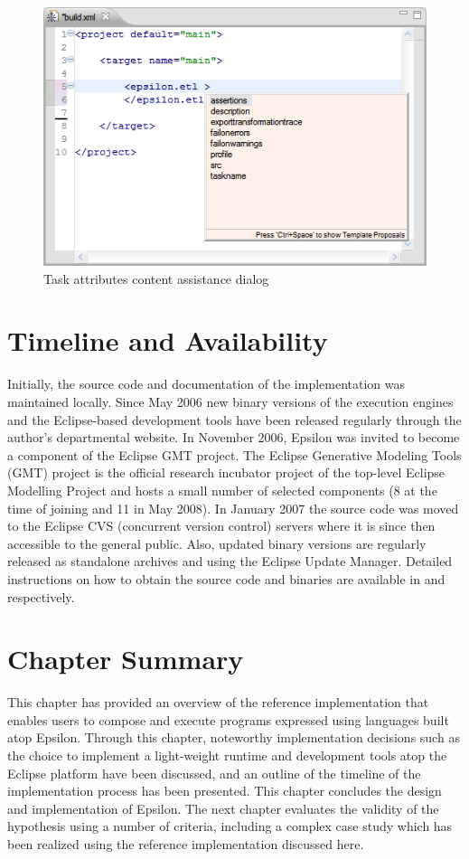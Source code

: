 \begin{figure}
	\centering
		\includegraphics{images/ANTScreenshot2.png}
	\caption{Task attributes content assistance dialog}
	\label{fig:ANTScreenshot2}
\end{figure}

\section{Timeline and Availability}
\label{sec:Implementation.Timeline}

Initially, the source code and documentation of the implementation was maintained locally. Since May 2006 new binary versions of the execution engines and the Eclipse-based development tools have been released regularly through the author's departmental website. In November 2006, Epsilon was invited to become a component of the Eclipse GMT project. The Eclipse Generative Modeling Tools (GMT) project is the official research incubator project of the top-level Eclipse Modelling Project and hosts a small number of selected components (8 at the time of joining and 11 in May 2008). In January 2007 the source code was moved to the Eclipse CVS (concurrent version control) servers where it is since then accessible to the general public. Also, updated binary versions are regularly released as standalone archives and using the Eclipse Update Manager. Detailed instructions on how to obtain the source code and binaries are available in \cite{CVSInstallation} and \cite{BinariesInstallation} respectively.

\section{Chapter Summary}

This chapter has provided an overview of the reference implementation that enables users to compose and execute programs expressed using languages built atop Epsilon. Through this chapter, noteworthy implementation decisions such as the choice to implement a light-weight runtime and development tools atop the Eclipse platform have been discussed, and an outline of the timeline of the implementation process has been presented. This chapter concludes the design and implementation of Epsilon. The next chapter evaluates the validity of the hypothesis using a number of criteria, including a complex case study which has been realized using the reference implementation discussed here.